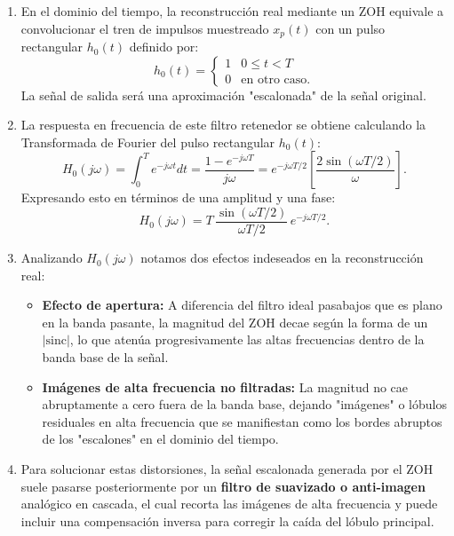 \documentclass[11pt,a4paper,openany]{book}
\begin{document}
\begin{enumerate}
	\item En el dominio del tiempo, la reconstrucción real mediante un ZOH equivale a convolucionar el tren de impulsos muestreado $x_p(t)$ con un pulso rectangular $h_0(t)$ definido por:
	\begin{equation}
		h_0(t) = 
		\begin{cases}
			1 & 0 \leq t < T \\
			0 & \text{en otro caso.}
		\end{cases}
	\end{equation}
	La señal de salida será una aproximación "escalonada" de la señal original.
	
	\item La respuesta en frecuencia de este filtro retenedor se obtiene calculando la Transformada de Fourier del pulso rectangular $h_0(t)$:
	\begin{equation}
		H_0(j\omega) = \int_{0}^{T} e^{-j\omega t} dt = \frac{1 - e^{-j\omega T}}{j\omega} = e^{-j\omega T/2} \left[ \frac{2 \sin(\omega T / 2)}{\omega} \right].
	\end{equation}
	Expresando esto en términos de una amplitud y una fase:
	\begin{equation}
		H_0(j\omega) = T \, \frac{\sin(\omega T/2)}{\omega T/2} \, e^{-j\omega T/2}.
	\end{equation}
	
	\item Analizando $H_0(j\omega)$ notamos dos efectos indeseados en la reconstrucción real:
	\begin{itemize}
		\item \textbf{Efecto de apertura:} A diferencia del filtro ideal pasabajos que es plano en la banda pasante, la magnitud del ZOH decae según la forma de un $|\text{sinc}|$, lo que atenúa progresivamente las altas frecuencias dentro de la banda base de la señal.
		\item \textbf{Imágenes de alta frecuencia no filtradas:} La magnitud no cae abruptamente a cero fuera de la banda base, dejando "imágenes" o lóbulos residuales en alta frecuencia que se manifiestan como los bordes abruptos de los "escalones" en el dominio del tiempo.
	\end{itemize}
	
	\item Para solucionar estas distorsiones, la señal escalonada generada por el ZOH suele pasarse posteriormente por un \textbf{filtro de suavizado o anti-imagen} analógico en cascada, el cual recorta las imágenes de alta frecuencia y puede incluir una compensación inversa para corregir la caída del lóbulo principal.
\end{enumerate}
\end{document}

